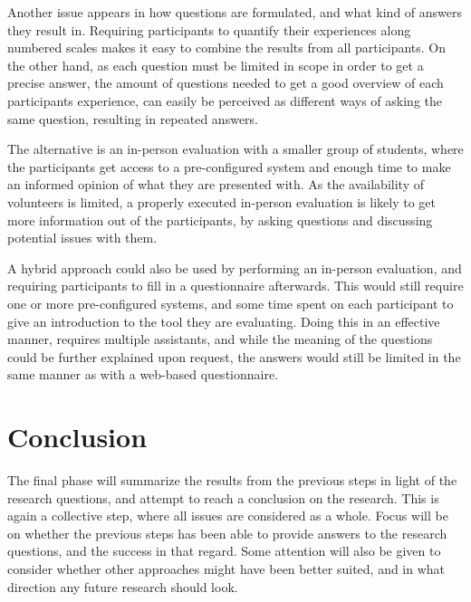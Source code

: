 Another issue appears in how questions are formulated, and what kind of answers they result in.
Requiring participants to quantify their experiences along numbered scales makes it easy to combine the results from all participants.
On the other hand, as each question must be limited in scope in order to get a precise answer, the amount of questions needed to get a good overview of each participants experience, can easily be perceived as different ways of asking the same question, resulting in repeated answers.

The alternative is an in-person evaluation with a smaller group of students, where the participants get access to a pre-configured system and enough time to make an informed opinion of what they are presented with.
As the availability of volunteers is limited, a properly executed in-person evaluation is likely to get more information out of the participants, by asking questions and discussing potential issues with them.

A hybrid approach could also be used by performing an in-person evaluation, and requiring participants to fill in a questionnaire afterwards.
This would still require one or more pre-configured systems, and some time spent on each participant to give an introduction to the tool they are evaluating.
Doing this in an effective manner, requires multiple assistants, and while the meaning of the questions could be further explained upon request, the answers would still be limited in the same manner as with a web-based questionnaire.

\section{Conclusion}\label{methConclude}

The final phase will summarize the results from the previous steps in light of the research questions, and attempt to reach a conclusion on the research.
This is again a collective step, where all issues are considered as a whole.
Focus will be on whether the previous steps has been able to provide answers to the research questions, and the success in that regard.
Some attention will also be given to consider whether other approaches might have been better suited, and in what direction any future research should look.









